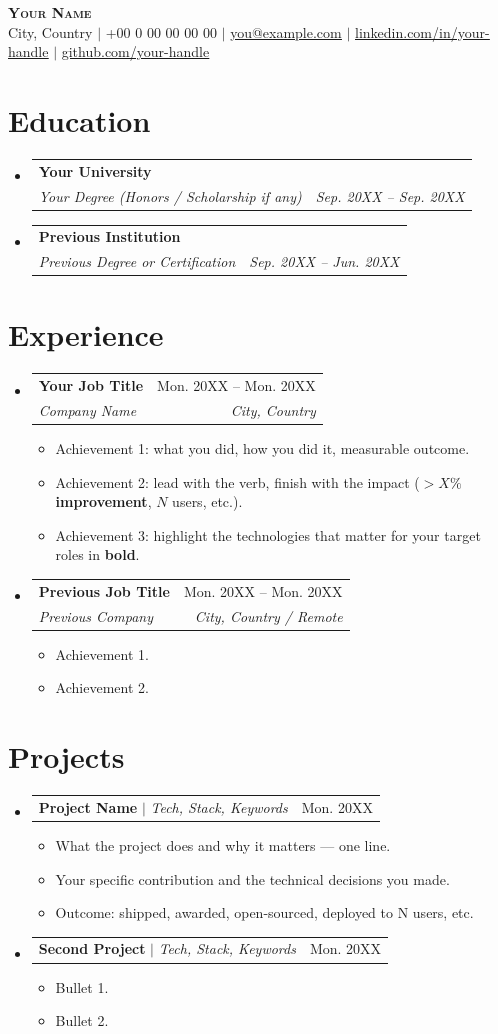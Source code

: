 \documentclass[letterpaper,11pt]{article}
\makeatletter
\newcommand{\resumeItem}[1]{
  \item\small{
    {#1 \vspace{-2pt}}
  }
}
\newcommand{\resumeSubheading}[4]{
  \vspace{-2pt}\item
    \begin{tabular*}{0.97\textwidth}[t]{l@{\extracolsep{\fill}}r}
      \textbf{#1} & #2 \\
      \textit{\small#3} & \textit{\small #4} \\
    \end{tabular*}\vspace{-7pt}
}
\newcommand{\resumeProjectHeading}[2]{
    \item
    \begin{tabular*}{0.97\textwidth}{l@{\extracolsep{\fill}}r}
      \small#1 & #2 \\
    \end{tabular*}\vspace{-7pt}
}
\newcommand{\resumeSubHeadingListStart}{\begin{itemize}[leftmargin=0.15in, label={}]}
\newcommand{\resumeSubHeadingListEnd}{\end{itemize}}
\newcommand{\resumeItemListStart}{\begin{itemize}}
\newcommand{\resumeItemListEnd}{\end{itemize}\vspace{-5pt}}
\makeatother
\begin{document}
\begin{center}
    \textbf{\Huge \scshape Your Name} \\ \vspace{1pt}
    City, Country $|$ \small +00 0 00 00 00 00 $|$ \href{mailto:you@example.com}{\underline{you@example.com}} $|$
    \href{https://linkedin.com/in/your-handle}{\underline{linkedin.com/in/your-handle}} $|$
    \href{https://github.com/your-handle}{\underline{github.com/your-handle}}
\end{center}


\section{Education}
  \resumeSubHeadingListStart
    \resumeSubheading
      {Your University}{}
      {Your Degree (Honors / Scholarship if any)}{Sep. 20XX -- Sep. 20XX}
    \resumeSubheading
      {Previous Institution}{}
      {Previous Degree or Certification}{Sep. 20XX -- Jun. 20XX}
  \resumeSubHeadingListEnd


\section{Experience}
  \resumeSubHeadingListStart

    \resumeSubheading
      {Your Job Title}{Mon. 20XX -- Mon. 20XX}
      {Company Name}{City, Country}
      \resumeItemListStart
        \resumeItem{Achievement 1: what you did, how you did it, measurable outcome.}
        \resumeItem{Achievement 2: lead with the verb, finish with the impact (\textbf{$>X\%$ improvement}, $N$ users, etc.).}
        \resumeItem{Achievement 3: highlight the technologies that matter for your target roles in \textbf{bold}.}
      \resumeItemListEnd

    \resumeSubheading
      {Previous Job Title}{Mon. 20XX -- Mon. 20XX}
      {Previous Company}{City, Country / Remote}
      \resumeItemListStart
        \resumeItem{Achievement 1.}
        \resumeItem{Achievement 2.}
      \resumeItemListEnd

  \resumeSubHeadingListEnd


\section{Projects}
    \resumeSubHeadingListStart
      \resumeProjectHeading
          {\textbf{Project Name} $|$ \emph{Tech, Stack, Keywords}}{Mon. 20XX}
          \resumeItemListStart
            \resumeItem{What the project does and why it matters — one line.}
            \resumeItem{Your specific contribution and the technical decisions you made.}
            \resumeItem{Outcome: shipped, awarded, open-sourced, deployed to N users, etc.}
          \resumeItemListEnd
      \resumeProjectHeading
          {\textbf{Second Project} $|$ \emph{Tech, Stack, Keywords}}{Mon. 20XX}
          \resumeItemListStart
            \resumeItem{Bullet 1.}
            \resumeItem{Bullet 2.}
          \resumeItemListEnd
    \resumeSubHeadingListEnd
\end{document}
